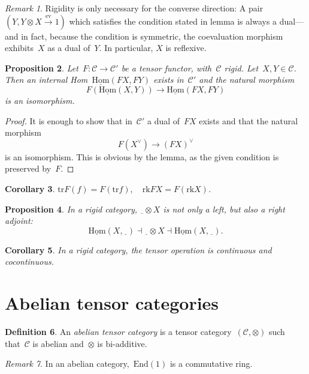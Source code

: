 \documentclass[a4paper,english,12pt]{scrartcl}
\theoremstyle{definition}
\newtheorem{defn}{Definition}[section]
\theoremstyle{plain}
\newtheorem{prop}[defn]{Proposition}
\newtheorem{cor}[defn]{Corollary}
\theoremstyle{remark}
\newtheorem{rem}[defn]{Remark}
\newcommand{\C}{\mathcal{C}}
\newcommand{\xra}[1]{\xrightarrow{#1}}
\renewcommand{\_}{\mathpunct{.}\,}
\newcommand{\?}{\,{:}\,}
\newcommand{\Hom}{\underline{\mathrm{Hom}}}
\newcommand{\End}{\mathrm{End}}
\newcommand{\ev}{\mathrm{ev}}
\newcommand{\freist}{\underline{\ \ }}
\newcommand{\tr}{\mathrm{tr}}
\newcommand{\rk}{\mathrm{rk}}
\begin{document}
\begin{rem}Rigidity is only necessary for the converse direction: A pair~$(Y, Y
\otimes X \xra{\ev} 1)$ which satisfies the condition stated in lemma is always
a dual---and in fact, because the condition is symmetric, the coevaluation
morphism exhibits~$X$ as a dual of~$Y$. In particular, $X$ is
reflexive.\end{rem}

\begin{prop}Let~$F : \C \to \C'$ be a tensor functor, with~$\C$ rigid.
Let~$X,Y \in \C$. Then an internal Hom~$\Hom(FX,FY)$ exists in~$\C'$ and the
natural morphism
\[ F(\Hom(X,Y)) \longrightarrow \Hom(FX,FY) \]
is an isomorphism.\end{prop}
\begin{proof}It is enough to show that in~$\C'$ a dual of~$FX$ exists and that
the natural morphism
\[ F(X^\vee) \longrightarrow (FX)^\vee \]
is an isomorphism. This is obvious by the lemma, as the given condition is
preserved by~$F$.\end{proof}

\begin{cor}$\tr F(f) = F(\tr f), \quad \rk FX = F(\rk X)$.\end{cor}

\begin{prop}In a rigid category, $\freist \otimes X$ is not only a left, but
also a right adjoint:
\[ \Hom(X,\freist) \dashv \freist \otimes X \dashv \Hom(X,\freist). \]
\end{prop}
\begin{cor}In a rigid category, the tensor operation is continuous and
cocontinuous.\end{cor}


\section{Abelian tensor categories}

\begin{defn}An \emph{abelian tensor category} is a tensor
category~$(\C,\otimes)$ such that~$\C$ is abelian and~$\otimes$ is
bi-additive.\end{defn}

\begin{rem}In an abelian category,~$\End(1)$ is a commutative ring.\end{rem}
\end{document}
